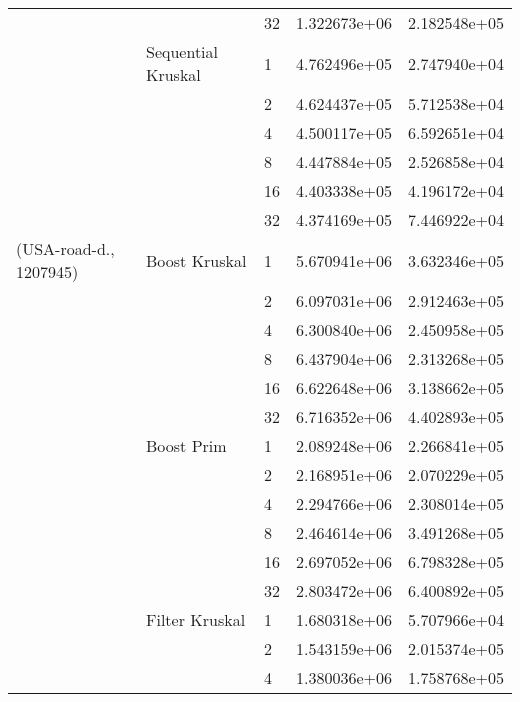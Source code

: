 \begin{tabular}{lllrr}
                       &                    & 32 &  1.322673e+06 &  2.182548e+05 \\
                       & Sequential Kruskal & 1  &  4.762496e+05 &  2.747940e+04 \\
                       &                    & 2  &  4.624437e+05 &  5.712538e+04 \\
                       &                    & 4  &  4.500117e+05 &  6.592651e+04 \\
                       &                    & 8  &  4.447884e+05 &  2.526858e+04 \\
                       &                    & 16 &  4.403338e+05 &  4.196172e+04 \\
                       &                    & 32 &  4.374169e+05 &  7.446922e+04 \\
(USA-road-d., 1207945) & Boost Kruskal & 1  &  5.670941e+06 &  3.632346e+05 \\
                       &                    & 2  &  6.097031e+06 &  2.912463e+05 \\
                       &                    & 4  &  6.300840e+06 &  2.450958e+05 \\
                       &                    & 8  &  6.437904e+06 &  2.313268e+05 \\
                       &                    & 16 &  6.622648e+06 &  3.138662e+05 \\
                       &                    & 32 &  6.716352e+06 &  4.402893e+05 \\
                       & Boost Prim & 1  &  2.089248e+06 &  2.266841e+05 \\
                       &                    & 2  &  2.168951e+06 &  2.070229e+05 \\
                       &                    & 4  &  2.294766e+06 &  2.308014e+05 \\
                       &                    & 8  &  2.464614e+06 &  3.491268e+05 \\
                       &                    & 16 &  2.697052e+06 &  6.798328e+05 \\
                       &                    & 32 &  2.803472e+06 &  6.400892e+05 \\
                       & Filter Kruskal & 1  &  1.680318e+06 &  5.707966e+04 \\
                       &                    & 2  &  1.543159e+06 &  2.015374e+05 \\
                       &                    & 4  &  1.380036e+06 &  1.758768e+05 \\

\end{tabular}
